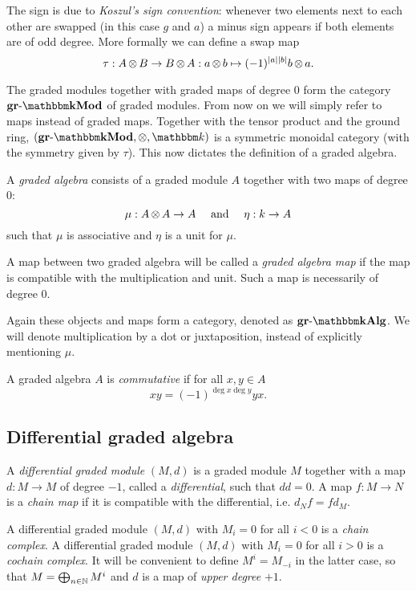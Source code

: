 The sign is due to \emph{Koszul's sign convention}: whenever two elements next to each other are swapped (in this case $g$ and $a$) a minus sign appears if both elements are of odd degree. More formally we can define a swap map
$$ \tau : A \operatorname*{\otimes} B \to B \operatorname*{\otimes} A : a \operatorname*{\otimes} b \mapsto (-1)^{{|{a}|}{|{b}|}} b \operatorname*{\otimes} a. $$

The graded modules together with graded maps of degree $0$ form the category $\grMod{\k}$ of graded modules. From now on we will simply refer to maps instead of graded maps. Together with the tensor product and the ground ring, $(\grMod{\k}, \tensor, \k)$ is a symmetric monoidal category (with the symmetry given by $\tau$). This now dictates the definition of a graded algebra.

\begin{definition}
	A \emph{graded algebra} consists of a graded module $A$ together with two maps of degree $0$:
	$$ \mu: A \operatorname*{\otimes} A \to A \quad\text{ and }\quad \eta: k \to A $$
	such that $\mu$ is associative and $\eta$ is a unit for $\mu$.

	A map between two graded algebra will be called a \emph{graded algebra map} if the map is compatible with the multiplication and unit. Such a map is necessarily of degree $0$.
\end{definition}

Again these objects and maps form a category, denoted as $\grAlg{\k}$. We will denote multiplication by a dot or juxtaposition, instead of explicitly mentioning $\mu$.

\begin{definition}
	A graded algebra $A$ is \emph{commutative} if for all $x, y \in A$
	$$ x y = (-1)^{\deg{x}\deg{y}} y x. $$
\end{definition}


\subsection{Differential graded algebra}

\begin{definition}
	A \emph{differential graded module} $(M, d)$ is a graded module $M$ together with a map $d: M \to M$ of degree $-1$, called a \emph{differential}, such that $dd = 0$. A map $f: M \to N$ is a \emph{chain map} if it is compatible with the differential, i.e. $d_N f = f d_M$.
\end{definition}

A differential graded module $(M, d)$ with $M_i = 0$ for all $i < 0$ is a \emph{chain complex}. A differential graded module $(M, d)$ with $M_i = 0$ for all $i > 0$ is a \emph{cochain complex}. It will be convenient to define $M^i = M_{-i}$ in the latter case, so that $M = \bigoplus_{n \in \mathbb{N}} M^i$ and $d$ is a map of \emph{upper degree} $+1$.

